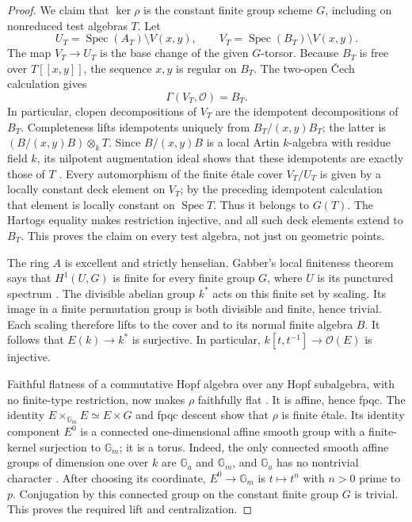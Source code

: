 \begin{proof}
We claim that $\ker\rho$ is the constant finite group scheme
$G$, including on nonreduced test algebras $T$.  Let
\[
 U_T=\operatorname{Spec}(A_T)\setminus V(x,y),\qquad
 V_T=\operatorname{Spec}(B_T)\setminus V(x,y).
\]
The map $V_T\to U_T$ is the base change of the given $G$-torsor.
Because $B_T$ is free over $T[[x,y]]$, the sequence $x,y$ is
regular on $B_T$.  The two-open \v Cech calculation gives
\[
 \Gamma(V_T,\mathcal O)=B_T.
\]
In particular, clopen decompositions of $V_T$ are the idempotent
decompositions of $B_T$.  Completeness lifts idempotents uniquely
from $B_T/(x,y)B_T$; the latter is
$(B/(x,y)B)\otimes_kT$.  Since $B/(x,y)B$ is a local Artin
$k$-algebra with residue field $k$, its nilpotent augmentation
ideal shows that these idempotents are exactly those of $T$
\cite[Section 15.11, tags 09XD, 09XI and 0ALI]{C_StacksFormalLift}.
Every automorphism of the finite \'etale cover $V_T/U_T$
is given by a locally constant deck element on $V_T$; by the
preceding idempotent calculation that element is locally constant
on $\operatorname{Spec}T$.  Thus it belongs to $G(T)$.
The Hartogs equality makes restriction injective, and all such
deck elements extend to $B_T$.  This proves the claim on every
test algebra, not just on geometric points.

The ring $A$ is excellent and strictly henselian.  Gabber's local
finiteness theorem says that $H^1(U,G)$ is finite for every finite
group $G$, where $U$ is its punctured spectrum
\cite[XXI, Theorem 1.4, p. 529]{ILOXXID}.
The divisible abelian group $k^*$ acts on this finite set by
scaling.  Its image in a finite permutation group is both
divisible and finite, hence trivial.  Each scaling therefore
lifts to the cover and to its normal finite algebra $B$.
It follows that $E(k)\to k^*$ is surjective.  In particular,
$k[t,t^{-1}]\to\mathcal O(E)$ is injective.

Faithful flatness of a commutative Hopf algebra over any Hopf
subalgebra, with no finite-type restriction, now makes $\rho$
faithfully flat
\cite[VI, Theorem 11.1, pp. 82--85]{C_MilneAGS2012}.
It is affine, hence fpqc.  The identity
$E\times_{\mathbb G_m}E\simeq E\times G$ and fpqc descent
show that $\rho$ is finite \'etale.  Its identity component
$E^0$ is a connected one-dimensional affine smooth group with
a finite-kernel surjection to $\mathbb G_m$; it is a torus.
Indeed, the only connected smooth affine groups of dimension
one over $k$ are $\mathbb G_a$ and $\mathbb G_m$, and
$\mathbb G_a$ has no nontrivial character
\cite[Corollary 16.16, p. 329]{C_MilneAG2022}.
After choosing its coordinate, $E^0\to\mathbb G_m$ is
$t\mapsto t^n$ with $n>0$ prime to $p$.  Conjugation by this
connected group on the constant finite group $G$ is trivial.
This proves the required lift and centralization.
\end{proof}

